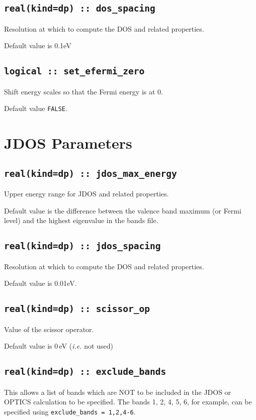 \documentclass[a4paper,11pt,twoside]{book}
\begin{document}
{\subsection[dos\_spacing]{\tt real(kind=dp) :: dos\_spacing}
Resolution at which to compute the DOS and related properties.

Default value is 0.1eV

\subsection[set\_efermi\_zero]{\tt logical :: set\_efermi\_zero}
Shift energy scales so that the Fermi energy is at 0.

Default value \verb#FALSE#.



\section{JDOS Parameters}

\subsection[jdos\_max\_energy]{\tt real(kind=dp) :: jdos\_max\_energy}
Upper energy range for JDOS and related properties.

Default value is the difference between the valence band maximum (or
Fermi level) and the highest eigenvalue in the bands file.

\subsection[jdos\_spacing]{\tt real(kind=dp) :: jdos\_spacing}
Resolution at which to compute the DOS and related properties.

Default value is 0.01eV.

\subsection[scissor\_op]{\tt real(kind=dp) :: scissor\_op}
Value of the scissor operator.

Default value is 0\,eV (\emph{i.e.} not used)

\subsection[exclude\_bands]{\tt real(kind=dp) :: exclude\_bands}
This allows a list of bands which are NOT to be included in the JDOS or OPTICS calculation to be specified.  The bands 1, 2, 4, 5, 6, for example, can be specified using \verb#exclude_bands = 1,2,4-6#.

}
\end{document}
